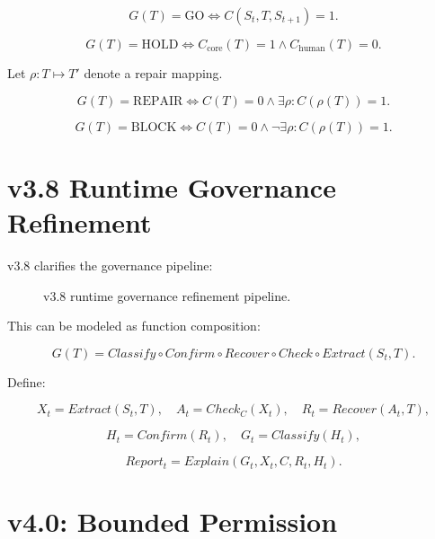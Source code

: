 \documentclass[11pt,a4paper]{article}
\newcommand{\GO}{\mathrm{GO}}
\newcommand{\HOLD}{\mathrm{HOLD}}
\newcommand{\REPAIR}{\mathrm{REPAIR}}
\newcommand{\BLOCK}{\mathrm{BLOCK}}
\begin{document}
\[
G(T)=\GO
\iff
C(S_t,T,S_{t+1})=1.
\]

\[
G(T)=\HOLD
\iff
C_{\mathrm{core}}(T)=1
\land
C_{\mathrm{human}}(T)=0.
\]

Let \(\rho:T\mapsto T'\) denote a repair mapping.

\[
G(T)=\REPAIR
\iff
C(T)=0
\land
\exists \rho : C(\rho(T))=1.
\]

\[
G(T)=\BLOCK
\iff
C(T)=0
\land
\neg \exists \rho : C(\rho(T))=1.
\]

\section{v3.8 Runtime Governance Refinement}

v3.8 clarifies the governance pipeline:

\begin{figure}[H]
\centering
{}
\caption{v3.8 runtime governance refinement pipeline.}
\end{figure}

This can be modeled as function composition:

\[
G(T)
=
Classify
\circ
Confirm
\circ
Recover
\circ
Check
\circ
Extract
(S_t,T).
\]

Define:

\[
X_t = Extract(S_t,T),
\quad
A_t = Check_C(X_t),
\quad
R_t = Recover(A_t,T),
\]

\[
H_t = Confirm(R_t),
\quad
G_t = Classify(H_t),
\]

\[
Report_t = Explain(G_t,X_t,C,R_t,H_t).
\]

\section{\texorpdfstring{\mbox{v4.0}: Bounded Permission}{v4.0: Bounded Permission}}
\end{document}
